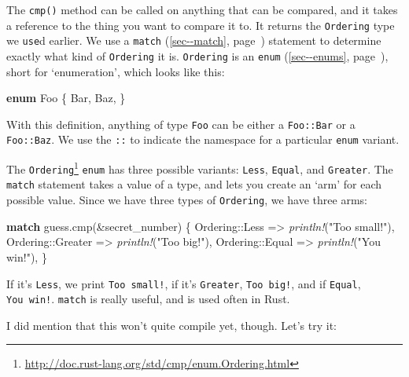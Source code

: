 \documentclass[a4paper,]{book}
\renewcommand*{\hyperref}[2][\ar]{%
  \def\ar{#2}%
  #2 (\autoref{#1}, page~\pageref{#1})}
\newenvironment{Shaded}{\begin{snugshade}}{\end{snugshade}}
\newcommand{\KeywordTok}[1]{\textcolor[rgb]{0.13,0.29,0.53}{\textbf{{#1}}}}
\newcommand{\StringTok}[1]{\textcolor[rgb]{0.31,0.60,0.02}{{#1}}}
\newcommand{\PreprocessorTok}[1]{\textcolor[rgb]{0.56,0.35,0.01}{\textit{{#1}}}}
\newcommand{\NormalTok}[1]{{#1}}
\renewcommand{\href}[2]{#2\footnote{\url{#1}}}
\begin{document}
The \texttt{cmp()} method can be called on anything that can be
compared, and it takes a reference to the thing you want to compare it
to. It returns the \texttt{Ordering} type we \texttt{use}d earlier. We
use a \hyperref[sec--match]{\texttt{match}} statement to determine
exactly what kind of \texttt{Ordering} it is. \texttt{Ordering} is an
\hyperref[sec--enums]{\texttt{enum}}, short for `enumeration', which
looks like this:

\begin{Shaded}
\begin{Highlighting}[]
\KeywordTok{enum} \NormalTok{Foo \{}
    \NormalTok{Bar,}
    \NormalTok{Baz,}
\NormalTok{\}}
\end{Highlighting}
\end{Shaded}

With this definition, anything of type \texttt{Foo} can be either a
\texttt{Foo::Bar} or a \texttt{Foo::Baz}. We use the \texttt{::} to
indicate the namespace for a particular \texttt{enum} variant.

The
\href{http://doc.rust-lang.org/std/cmp/enum.Ordering.html}{\texttt{Ordering}}
\texttt{enum} has three possible variants: \texttt{Less},
\texttt{Equal}, and \texttt{Greater}. The \texttt{match} statement takes
a value of a type, and lets you create an `arm' for each possible value.
Since we have three types of \texttt{Ordering}, we have three arms:

\begin{Shaded}
\begin{Highlighting}[]
\KeywordTok{match} \NormalTok{guess.cmp(&secret_number) \{}
    \NormalTok{Ordering::Less    => }\PreprocessorTok{println!}\NormalTok{(}\StringTok{"Too small!"}\NormalTok{),}
    \NormalTok{Ordering::Greater => }\PreprocessorTok{println!}\NormalTok{(}\StringTok{"Too big!"}\NormalTok{),}
    \NormalTok{Ordering::Equal   => }\PreprocessorTok{println!}\NormalTok{(}\StringTok{"You win!"}\NormalTok{),}
\NormalTok{\}}
\end{Highlighting}
\end{Shaded}

If it's \texttt{Less}, we print \texttt{Too\ small!}, if it's
\texttt{Greater}, \texttt{Too\ big!}, and if \texttt{Equal},
\texttt{You\ win!}. \texttt{match} is really useful, and is used often
in Rust.

I did mention that this won't quite compile yet, though. Let's try it:
\end{document}
